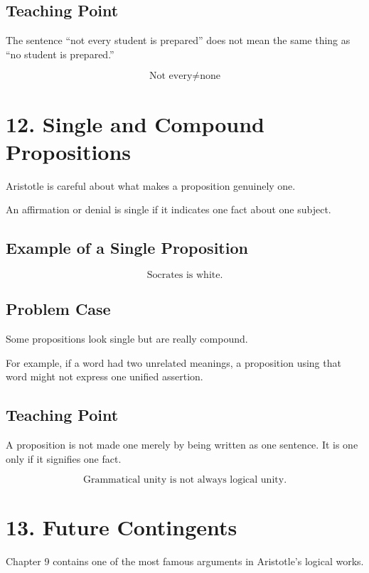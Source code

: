 \documentclass[12pt]{article}
\begin{document}
\subsection*{Teaching Point}

The sentence ``not every student is prepared'' does not mean the same thing as
``no student is prepared.''

\[
\boxed{
\text{Not every} \neq \text{none}
}
\]

\section*{12. Single and Compound Propositions}

Aristotle is careful about what makes a proposition genuinely one.

An affirmation or denial is single if it indicates one fact about one subject.

\subsection*{Example of a Single Proposition}

\[
\text{Socrates is white.}
\]

\subsection*{Problem Case}

Some propositions look single but are really compound.

For example, if a word had two unrelated meanings, a proposition using that word
might not express one unified assertion.

\subsection*{Teaching Point}

A proposition is not made one merely by being written as one sentence. It is one
only if it signifies one fact.

\[
\boxed{
\text{Grammatical unity is not always logical unity.}
}
\]

\section*{13. Future Contingents}

Chapter 9 contains one of the most famous arguments in Aristotle's logical
works.
\end{document}
